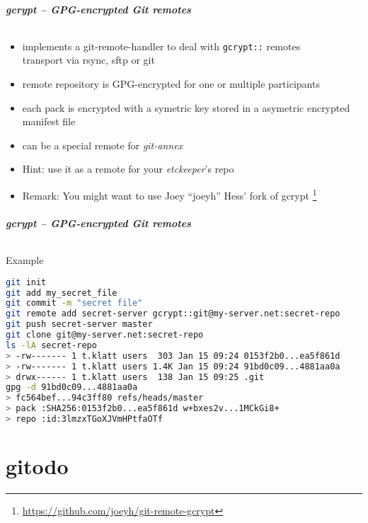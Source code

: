 \documentclass[english,hyperref={pdfpagelabels=false},aspectratio=169]{beamer}
\begin{document}
\begin{frame}[label=gcrypt]
  \frametitle{gcrypt -- GPG-encrypted Git remotes}
  \framesubtitle{}
  \begin{itemize}
    \item implements a git-remote-handler to deal with \texttt{gcrypt::} remotes\\
      {\scriptsize transport via rsync, sftp or git}
    \item remote repository is GPG-encrypted for one or multiple participants
    \item each pack is encrypted with a symetric key stored in a asymetric encrypted manifest file
    \item can be a special remote for \textit{git-annex}
    \item Hint: use it as a remote for your \textit{etckeeper}'s repo
    \item Remark: You might want to use Joey ``joeyh'' Hess' fork of gcrypt
      \footnote{\tiny\url{https://github.com/joeyh/git-remote-gcrypt}}
  \end{itemize}
\end{frame}

\begin{frame}[fragile]
  \frametitle{gcrypt -- GPG-encrypted Git remotes}
  \framesubtitle{}
  \begin{block}{Example}
    \vspace{-0.75em}
    \begin{lstlisting}[language=zsh]
git init
git add my_secret_file
git commit -m "secret file"
git remote add secret-server gcrypt::git@my-server.net:secret-repo
git push secret-server master
git clone git@my-server.net:secret-repo
ls -lA secret-repo
> -rw------- 1 t.klatt users  303 Jan 15 09:24 0153f2b0...ea5f861d
> -rw------- 1 t.klatt users 1.4K Jan 15 09:24 91bd0c09...4881aa0a
> drwx------ 1 t.klatt users  138 Jan 15 09:25 .git
gpg -d 91bd0c09...4881aa0a
> fc564bef...94c3ff80 refs/heads/master
> pack :SHA256:0153f2b0...ea5f861d w+bxes2v...1MCkGi8+
> repo :id:3lmzxTGoXJVmHPtfaOTf
    \end{lstlisting}
    \vspace{-0.75em}
  \end{block}
\end{frame}


\part{gitodo}
\makepart
\end{document}
